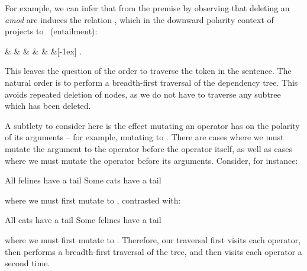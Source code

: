 For example, we can infer that 
   from the premise
   by observing that deleting
  an \textit{amod} arc induces the relation \reverse, which in the downward
  polarity context of \textit{} projects to \forward\ (entailment):

\begin{center}
\begin{dependency}[text only label, label style={above}]
  \begin{deptext}[column sep=-0.00cm]
     \&  \&  \& 
       \&  \&  \&[-1ex] .\\
  \end{deptext}
\end{dependency}
\end{center}

This leaves the question of the order to traverse the token in the sentence.
The natural order is to perform a breadth-first traversal of the dependency tree.
This avoids repeated deletion of nodes, as we do not have to traverse any
  subtree which has been deleted.

A subtlety to consider here is the effect mutating an operator has on the
  polarity of its arguments -- for example, mutating  to
  .
There are cases where we must mutate the argument to the operator before
  the operator itself, as well as cases where we must mutate the operator
  before its arguments.
Consider, for instance:

\entailmentExample
{All felines have a tail}
{Some cats have a tail}

\noindent where we must first mutate  to , contrasted with:

\entailmentExample
{All cats have a tail}
{Some felines have a tail}

\noindent where we must first mutate  to .
Therefore, our traversal first visits each operator, then performs a breadth-first
  traversal of the tree, and then visits each operator a second time.

